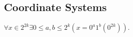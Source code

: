 \documentclass[11pt]{article}
\theoremstyle{pleasant}
\newtheorem{proposition}{Proposition}
\newcommand{\0}{\underline{0}}
\newcommand{\1}{\underline{1}}
\newcommand{\2}{\underline{2}}
\renewcommand{\S}{\mathcal{S}}
\begin{document}





\subsection*{Coordinate Systems}
$\forall x \in 2^{2k} \exists 0 \leq a, b \leq 2^k (x = 0^a 1^b(0^{2k}))$.





\end{document}
